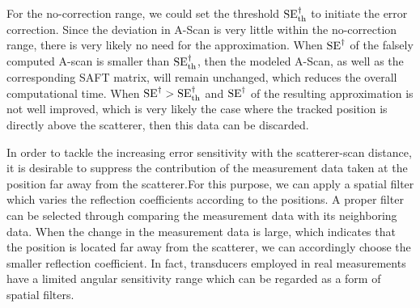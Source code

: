 For the no-correction range, we could set the threshold $\operatorname{SE}^{\dagger}_{\operatorname{th}}$ to initiate the error correction. Since the deviation in A-Scan is very little within the no-correction range, there is very likely no need for the approximation. When $\operatorname{SE}^{\dagger}$ of the falsely computed A-scan is smaller than $\operatorname{SE}^{\dagger}_{\operatorname{th}}$, then the modeled A-Scan, as well as the corresponding SAFT matrix, will remain unchanged, which reduces the overall computational time. When $\operatorname{SE}^{\dagger} > \operatorname{SE}^{\dagger}_{\operatorname{th}}$ and $\operatorname{SE}^{\dagger}$ of the resulting approximation is not well improved, which is very likely the case where the tracked position is directly above the scatterer, then this data can be discarded.\par

In order to tackle the increasing error sensitivity with the scatterer-scan distance, it is desirable to suppress the contribution of the measurement data taken at the position far away from the scatterer.For this purpose, we can apply a spatial filter which varies the reflection coefficients according to the positions. A proper filter can be selected through comparing the measurement data with its neighboring data. When the change in the measurement data is large, which indicates that the position is located far away from the scatterer, we can accordingly choose the smaller reflection coefficient. In fact, transducers employed in real measurements have a limited angular sensitivity range which can be regarded as a form of spatial filters. \par
